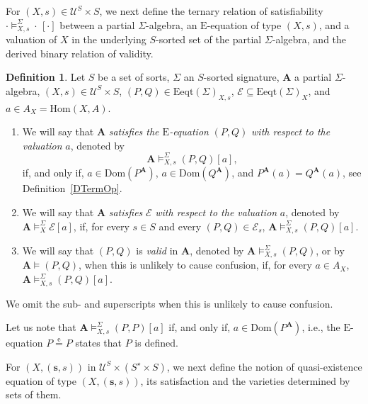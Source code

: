 \documentclass[a4paper, reqno
]{amsart}
\newcommand{\eeq}{\overset{\mathrm e}{=}}      %
\newcommand{\Dom}{\mathrm{Dom}}
\theoremstyle{plain}
\theoremstyle{definition}
\newtheorem{definition}[theorem]{Definition}
\begin{document}
For $(X,s)\in\boldsymbol{\mathcal{U}}^{S}\times S$, we next define the ternary relation of satisfiability $\cdot \models^{\Sigma}_{X,s}\!\!\cdot\, [\cdot]$ between a partial $\Sigma$-algebra, an $\mathrm{E}$-equation of type $(X,s)$, and a valuation of $X$ in the underlying $S$-sorted set of the partial $\Sigma$-algebra, and the derived binary relation of validity.

\begin{definition}\label{DEEqSat}
Let $S$ be a set of sorts, $\Sigma$ an $S$-sorted signature, $\mathbf{A}$ a partial $\Sigma$-algebra, $(X,s)\in\boldsymbol{\mathcal{U}}^{S}\times S$, $(P,Q)\in \mathrm{Eeqt}(\Sigma)_{X,s}$, $\mathcal{E}\subseteq \mathrm{Eeqt}(\Sigma)_{X}$, and $a\in A_{X} = \mathrm{Hom}(X,A)$.
\begin{enumerate}
\item We will say that $\mathbf{A}$ \emph{satisfies the $\mathrm{E}$-equation} $(P,Q)$ \emph{with respect to the valuation} $a$, denoted by
      $$
      \mathbf{A}\models^{\Sigma}_{X,s}(P,Q) [a],
      $$
      if, and only if, $a\in\Dom(P^{\mathbf{A}})$, $a\in\Dom(Q^{\mathbf{A}})$, and $P^{\mathbf{A}}(a) = Q^{\mathbf{A}}(a)$, see Definition~\ref{DTermOp}.
\item We will say that $\mathbf{A}$ \emph{satisfies} $\mathcal{E}$ \emph{with respect to the valuation} $a$, denoted by $\mathbf{A}\models^{\Sigma}_{X}\mathcal{E}[a]$, if, for every $s\in S$ and every $(P,Q)\in\mathcal{E}_{s}$, $\mathbf{A}\models^{\Sigma}_{X,s}(P,Q)[a]$.
\item We will say that $(P,Q)$ is \emph{valid} in $\mathbf{A}$, denoted by $\mathbf{A}\models^{\Sigma}_{X,s}(P,Q)$, or by $\mathbf{A}\models(P,Q)$, when this is unlikely to cause confusion, if, for every $a\in A_{X}$, $\mathbf{A}\models^{\Sigma}_{X,s}(P,Q) [a]$.
\end{enumerate}
We omit the sub- and superscripts when this is unlikely to cause confusion.
\end{definition}

Let us note that $\mathbf{A}\models^{\Sigma}_{X,s}(P,P)[a]$ if, and only if, $a\in\Dom(P^{\mathbf{A}})$, i.e., the $\mathrm{E}$-equation $P\eeq P$ states that $P$ is defined.

For $(X,(\mathbf{s},s))$ in $\boldsymbol{\mathcal{U}}^{S}\times (S^{\star}\times S)$, we next define the notion of quasi-existence equation of type $(X,(\mathbf{s},s))$, its satisfaction and the varieties determined by sets of them.
\end{document}
